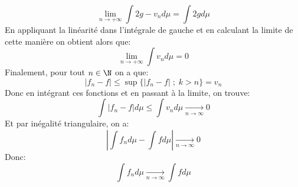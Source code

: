 \documentclass{report}
\begin{document}
   \[
      \lim_{n \rightarrow +\infty} \int 2g - v_n d\mu = \int 2g d\mu
   \]
   En appliquant la linéarité dans l'intégrale de gauche et en calculant la limite de cette manière on obtient alors que:
   \[
      \lim_{n \rightarrow +\infty} \int v_n d\mu = 0
   \]
   Finalement, pour tout \(n \in \N\) on a que:
   \[
      |f_n - f| \leq \sup\{|f_n - f| \; ; \; k > n\} = v_n
   \]
   Donc en intégrant ces fonctions et en passant à la limite, on trouve:
   \[
      \int |f_n - f| d\mu \leq \int v_n d\mu \underset{n \rightarrow \infty}{\longrightarrow} 0
   \]
   Et par inégalité triangulaire, on a: 
   \[
      \left|\int f_n d\mu - \int f d\mu  \right| \underset{n \rightarrow \infty}{\longrightarrow} 0
   \]
   Donc:
   \[
      \int f_n d\mu \underset{n \rightarrow \infty}{\longrightarrow} \int f d\mu
   \]

   \pagebreak
  
\end{document}
